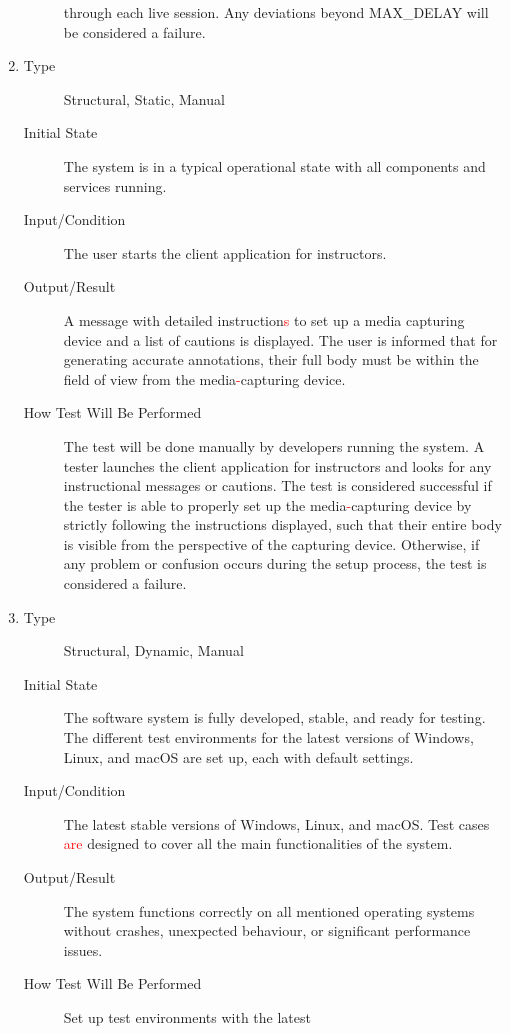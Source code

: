 \documentclass[12pt, titlepage]{article}
\newcommand{\rt}[1]{\textcolor{red}{#1}}
\begin{document}
\begin{enumerate}[NFR-T1]
\begin{description}
    through each live session. Any deviations beyond MAX\_DELAY will be
    considered a failure.
  \end{description}
\item \label{NFRT15}
  \begin{description}
  \item[Type] Structural, Static, Manual
  \item[Initial State] The system is in a typical operational state with all
    components and services running.
  \item[Input/Condition] The user starts the client application for instructors.
  \item[Output/Result] A message with detailed instruction\rt{s} to set up a media
    capturing device and a list of cautions is displayed. The user is informed
    that for generating accurate annotations, their full body must be within the
    field of view from the media\rt{-}capturing device.
  \item[How Test Will Be Performed] The test will be done manually by developers
    running the system. A tester launches the client application for instructors
    and looks for any instructional messages or cautions. The test is considered
    successful if the tester is able to properly set up the media\rt{-}capturing
    device by strictly following the instructions displayed, such that their
    entire body is visible from the perspective of the capturing device.
    Otherwise, if any problem or confusion occurs during the setup process, the
    test is considered a failure.
  \end{description}
\item \label{NFRT16}
  \begin{description}
  \item[Type] Structural, Dynamic, Manual
  \item[Initial State] The software system is fully developed, stable, and ready
    for testing. The different test environments for the latest versions of
    Windows, Linux, and macOS are set up, each with default settings.
  \item[Input/Condition] The latest stable versions of Windows, Linux, and
    macOS. Test cases \rt{are} designed to cover all the main functionalities of the
    system.
  \item[Output/Result] The system functions correctly on all mentioned operating
    systems without crashes, unexpected behaviour, or significant performance
    issues.
  \item[How Test Will Be Performed] Set up test environments with the latest

\end{description}
\end{enumerate}
\end{document}
